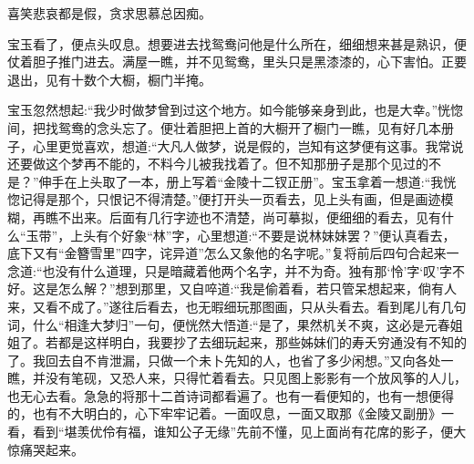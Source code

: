 \begin{poem}
    \begin{pl}
        喜笑悲哀都是假，贪求思慕总因痴。
    \end{pl}
\end{poem}


\begin{parag}
    宝玉看了，便点头叹息。想要进去找鸳鸯问他是什么所在，细细想来甚是熟识，便仗着胆子推门进去。满屋一瞧，并不见鸳鸯，里头只是黑漆漆的，心下害怕。正要退出，见有十数个大橱，橱门半掩。
\end{parag}


\begin{parag}
    宝玉忽然想起:“我少时做梦曾到过这个地方。如今能够亲身到此，也是大幸。”恍惚间，把找鸳鸯的念头忘了。便壮着胆把上首的大橱开了橱门一瞧，见有好几本册子，心里更觉喜欢，想道:“大凡人做梦，说是假的，岂知有这梦便有这事。我常说还要做这个梦再不能的，不料今儿被我找着了。但不知那册子是那个见过的不是？”伸手在上头取了一本，册上写着“金陵十二钗正册”。宝玉拿着一想道:“我恍惚记得是那个，只恨记不得清楚。”便打开头一页看去，见上头有画，但是画迹模糊，再瞧不出来。后面有几行字迹也不清楚，尚可摹拟，便细细的看去，见有什么“玉带”，上头有个好象“林”字，心里想道:“不要是说林妹妹罢？”便认真看去，底下又有“金簪雪里”四字，诧异道”怎么又象他的名字呢。”复将前后四句合起来一念道:“也没有什么道理，只是暗藏着他两个名字，并不为奇。独有那‘怜’字‘叹’字不好。这是怎么解？”想到那里，又自啐道:“我是偷着看，若只管呆想起来，倘有人来，又看不成了。”遂往后看去，也无暇细玩那图画，只从头看去。看到尾儿有几句词，什么“相逢大梦归”一句，便恍然大悟道:“是了，果然机关不爽，这必是元春姐姐了。若都是这样明白，我要抄了去细玩起来，那些姊妹们的寿夭穷通没有不知的了。我回去自不肯泄漏，只做一个未卜先知的人，也省了多少闲想。”又向各处一瞧，并没有笔砚，又恐人来，只得忙着看去。只见图上影影有一个放风筝的人儿，也无心去看。急急的将那十二首诗词都看遍了。也有一看便知的，也有一想便得的，也有不大明白的，心下牢牢记着。一面叹息，一面又取那《金陵又副册》一看，看到“堪羡优伶有福，谁知公子无缘”先前不懂，见上面尚有花席的影子，便大惊痛哭起来。
\end{parag}


